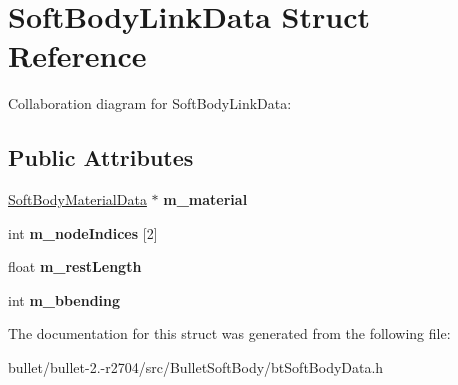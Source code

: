 \hypertarget{struct_soft_body_link_data}{\section{Soft\+Body\+Link\+Data Struct Reference}
\label{struct_soft_body_link_data}
}


Collaboration diagram for Soft\+Body\+Link\+Data\+:
\subsection*{Public Attributes}
\begin{DoxyCompactItemize}
\item 
\hypertarget{struct_soft_body_link_data_a4d930951b51d81f0ecd1c91b69370292}{\hyperlink{struct_soft_body_material_data}{Soft\+Body\+Material\+Data} $\ast$ {\bfseries m\+\_\+material}}\label{struct_soft_body_link_data_a4d930951b51d81f0ecd1c91b69370292}

\item 
\hypertarget{struct_soft_body_link_data_a2d6e0b5cf017da8c450099f775f965a3}{int {\bfseries m\+\_\+node\+Indices} \mbox{[}2\mbox{]}}\label{struct_soft_body_link_data_a2d6e0b5cf017da8c450099f775f965a3}

\item 
\hypertarget{struct_soft_body_link_data_ae5fb5d5d3cfdf9b427360ad0211344df}{float {\bfseries m\+\_\+rest\+Length}}\label{struct_soft_body_link_data_ae5fb5d5d3cfdf9b427360ad0211344df}

\item 
\hypertarget{struct_soft_body_link_data_a9203bb205397199fa65fd760d178a74d}{int {\bfseries m\+\_\+bbending}}\label{struct_soft_body_link_data_a9203bb205397199fa65fd760d178a74d}

\end{DoxyCompactItemize}


The documentation for this struct was generated from the following file\+:\begin{DoxyCompactItemize}
\item 
bullet/bullet-\/2.-\/r2704/src/\+Bullet\+Soft\+Body/bt\+Soft\+Body\+Data.\+h\end{DoxyCompactItemize}
